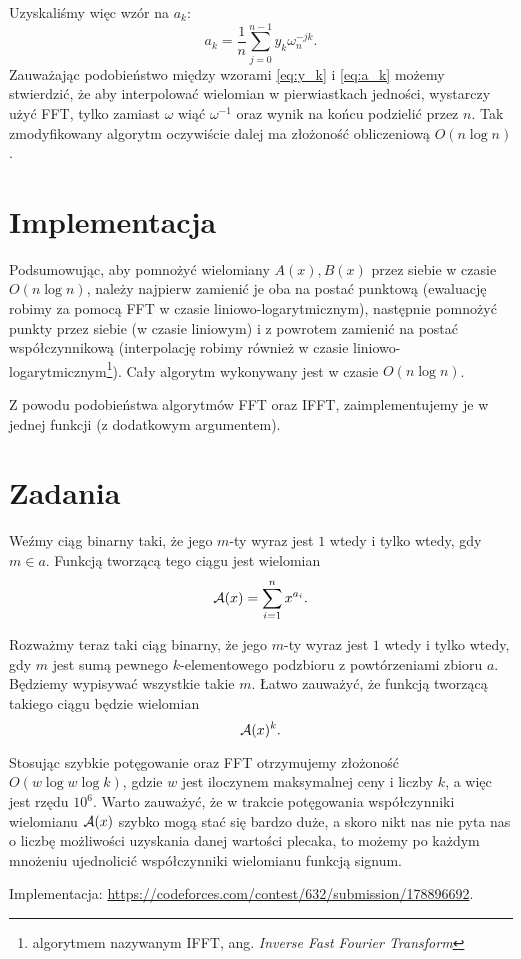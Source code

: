 \documentclass[11pt]{scrartcl}
\begin{document}
    Uzyskaliśmy więc wzór na $a_k$:
    \begin{equation}
        \label{eq:a_k}
        a_k = \frac{1}{n} \sum_{j=0}^{n-1} y_k\omega_n^{-jk}.
    \end{equation}
    Zauważając podobieństwo między wzorami \ref{eq:y_k} i \ref{eq:a_k} możemy stwierdzić, że aby interpolować wielomian w pierwiastkach jedności, wystarczy użyć FFT, tylko zamiast $\omega$ wiąć $\omega^{-1}$ oraz wynik na końcu podzielić przez $n$. Tak zmodyfikowany algorytm oczywiście dalej ma złożoność obliczeniową $O(n\log n)$.

\section{Implementacja}
    Podsumowując, aby pomnożyć wielomiany $A(x), B(x)$ przez siebie w czasie $O(n\log n)$, należy najpierw zamienić je oba na postać punktową (ewaluację robimy za pomocą FFT w czasie liniowo-logarytmicznym), następnie pomnożyć punkty przez siebie (w czasie liniowym) i z powrotem zamienić na postać współczynnikową (interpolację robimy również w czasie liniowo-logarytmicznym\footnote{algorytmem nazywanym IFFT, ang. \textit{Inverse Fast Fourier Transform}}). Cały algorytm wykonywany jest w czasie $O(n\log n)$.

    Z powodu podobieństwa algorytmów FFT oraz IFFT, zaimplementujemy je w jednej funkcji (z dodatkowym argumentem).

    

\section{Zadania}
    \begin{problem}
        \begin{answer}
            Weźmy ciąg binarny taki, że jego $m$-ty wyraz jest $1$ wtedy i tylko wtedy, gdy $m \in a$. Funkcją tworzącą tego ciągu jest wielomian
            $$ \mathcal A(x) = \sum_{i=1}^n x^{a_i}. $$

            Rozważmy teraz taki ciąg binarny, że jego $m$-ty wyraz jest $1$ wtedy i tylko wtedy, gdy $m$ jest sumą pewnego $k$-elementowego podzbioru z powtórzeniami zbioru $a$. Będziemy wypisywać wszystkie takie $m$. Łatwo zauważyć, że funkcją tworzącą takiego ciągu będzie wielomian
            $$ \mathcal A(x)^k. $$

            Stosując szybkie potęgowanie oraz FFT otrzymujemy złożoność $O(w\log{w}\log{k})$, gdzie $w$ jest iloczynem maksymalnej ceny i liczby $k$, a więc jest rzędu $10^6$. Warto zauważyć, że w trakcie potęgowania współczynniki wielomianu $\mathcal A(x)$ szybko mogą stać się bardzo duże, a skoro nikt nas nie pyta nas o liczbę możliwości uzyskania danej wartości plecaka, to możemy po każdym mnożeniu ujednolicić współczynniki wielomianu funkcją signum.

            Implementacja: \url{https://codeforces.com/contest/632/submission/178896692}.
        \end{answer}
    \end{problem}
\end{document}
